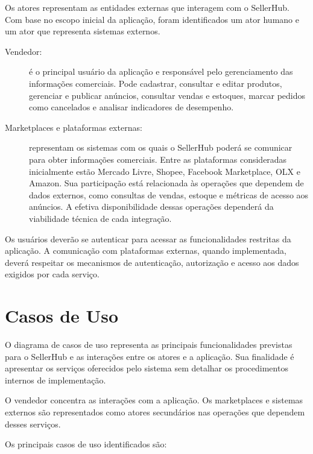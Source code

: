 Os atores representam as entidades externas que interagem com o SellerHub. Com base no escopo inicial da aplicação, foram identificados um ator humano e um ator que representa sistemas externos.

\begin{description}
    \item[Vendedor:] é o principal usuário da aplicação e responsável pelo gerenciamento das informações comerciais. Pode cadastrar, consultar e editar produtos, gerenciar e publicar anúncios, consultar vendas e estoques, marcar pedidos como cancelados e analisar indicadores de desempenho.
    \item[Marketplaces e plataformas externas:] representam os sistemas com os quais o SellerHub poderá se comunicar para obter informações comerciais. Entre as plataformas consideradas inicialmente estão Mercado Livre, Shopee, Facebook Marketplace, OLX e Amazon. Sua participação está relacionada às operações que dependem de dados externos, como consultas de vendas, estoque e métricas de acesso aos anúncios. A efetiva disponibilidade dessas operações dependerá da viabilidade técnica de cada integração.
\end{description}

Os usuários deverão se autenticar para acessar as funcionalidades restritas da aplicação. A comunicação com plataformas externas, quando implementada, deverá respeitar os mecanismos de autenticação, autorização e acesso aos dados exigidos por cada serviço.

\section{Casos de Uso}

O diagrama de casos de uso representa as principais funcionalidades previstas para o SellerHub e as interações entre os atores e a aplicação. Sua finalidade é apresentar os serviços oferecidos pelo sistema sem detalhar os procedimentos internos de implementação.

O vendedor concentra as interações com a aplicação. Os marketplaces e sistemas externos são representados como atores secundários nas operações que dependem desses serviços.

Os principais casos de uso identificados são:


